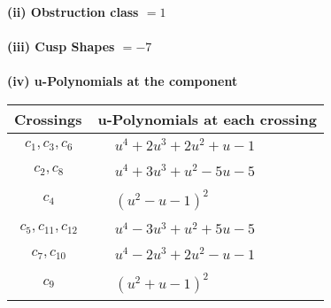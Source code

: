 \documentclass[1p]{elsarticle_modified}
\theoremstyle{definition}
\begin{document}
\flushleft \textbf{(ii) Obstruction class $= 1$}\\~\\
\flushleft \textbf{(iii) Cusp Shapes $= -7$}\\~\\
\newpage\renewcommand{\arraystretch}{1}
\flushleft \textbf{(iv) u-Polynomials at the component}\newline \\
\begin{tabular}{m{50pt}|m{274pt}}
Crossings & \hspace{64pt}u-Polynomials at each crossing \\
\hline $$\begin{aligned}c_{1},c_{3},c_{6}\end{aligned}$$&$\begin{aligned}
&u^4+2 u^3+2 u^2+u-1
\end{aligned}$\\
\hline $$\begin{aligned}c_{2},c_{8}\end{aligned}$$&$\begin{aligned}
&u^4+3 u^3+u^2-5 u-5
\end{aligned}$\\
\hline $$\begin{aligned}c_{4}\end{aligned}$$&$\begin{aligned}
&(u^2- u-1)^2
\end{aligned}$\\
\hline $$\begin{aligned}c_{5},c_{11},c_{12}\end{aligned}$$&$\begin{aligned}
&u^4-3 u^3+u^2+5 u-5
\end{aligned}$\\
\hline $$\begin{aligned}c_{7},c_{10}\end{aligned}$$&$\begin{aligned}
&u^4-2 u^3+2 u^2- u-1
\end{aligned}$\\
\hline $$\begin{aligned}c_{9}\end{aligned}$$&$\begin{aligned}
&(u^2+u-1)^2
\end{aligned}$\\
\hline
\end{tabular}\\~\\
\end{document}
